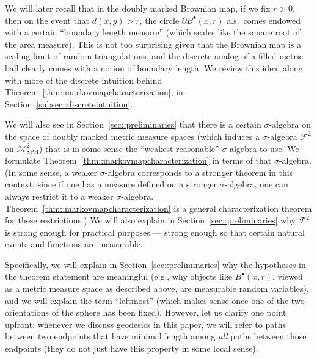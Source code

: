 \documentclass[JEP,XML,SOM,Unicode]{cedram}
\let\mathcal\mathscr
\newcommand{\sbullet}{{\scriptscriptstyle\bullet}}
\theoremstyle{plain}
\numberwithin{theorem}{section}
\theoremstyle{definition}
\newcommand\gmsspace{{\mathcal M}_{\mathrm{SPH}}}
\newcommand\mmsigma{{\mathcal F}}
\newcommand{\fb}[2]{B^\sbullet(#1,#2)}
\begin{document}
We will later recall that in the doubly marked Brownian map, if we fix $r>0$, then on the event that $d(x,y) > r$, the circle $\partial \fb{x}{r}$ a.s.\ comes endowed with a certain ``boundary length measure'' (which scales like the square root of the area measure). This is not too surprising given that the Brownian map is a scaling limit of random triangulations, and the discrete analog of a filled metric ball clearly comes with a notion of boundary length. We review this idea, along with more of the discrete intuition behind Theorem~\ref{thm::markovmapcharacterization}, in Section~\ref{subsec::discreteintuition}.

We will also see in Section~\ref{sec::preliminaries} that there is a certain $\sigma$-algebra on the space of doubly marked metric measure spaces (which induces a $\sigma$-algebra $ \mmsigma^2$ on $\gmsspace^2$) that is in some sense the ``weakest reasonable'' $\sigma$-algebra to use. We formulate Theorem~\ref{thm::markovmapcharacterization} in terms of that $\sigma$-algebra. (In some sense, a weaker $\sigma$-algebra corresponds to a stronger theorem in this context, since if one has a measure defined on a stronger $\sigma$-algebra, one can always restrict it to a weaker $\sigma$-algebra. Theorem~\ref{thm::markovmapcharacterization} is a general characterization theorem for these restrictions.) We will also explain in Section~\ref{sec::preliminaries} why $ \mmsigma^2$ is strong enough for practical purposes --- strong enough so that certain natural events and functions are measurable.

Specifically, we will explain in Section~\ref{sec::preliminaries} why the hypotheses in the theorem statement are meaningful (e.g., why objects like $\fb{x}{r}$, viewed as a metric measure space as described above, are measurable random variables), and we will explain the term ``leftmost'' (which makes sense once one of the two orientations of the sphere has been fixed). However, let us clarify one point upfront: whenever we discuss geodesics in this paper, we will refer to paths between two endpoints that have minimal length among \emph{all} paths between those endpoints (\ie they do not just have this property in some local sense).
\end{document}
